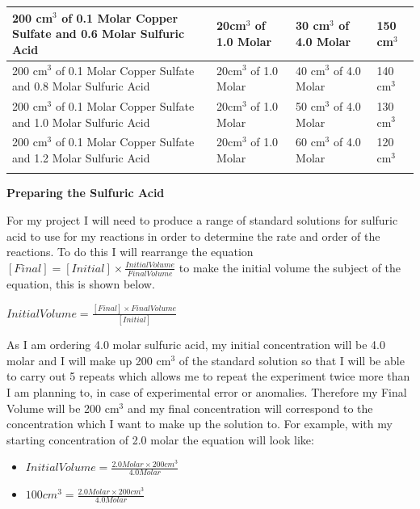 \begin{center}
\begin{tabular}{|p{5cm}|p{2cm}|p{2cm}|p{2cm}|}
200 cm$^3$ of 0.1 Molar Copper Sulfate and 0.6 Molar Sulfuric Acid &  20cm$^3$  of 1.0 Molar & 30 cm$^3$ of 4.0 Molar & 150 cm$^3$ \\ \hline

200 cm$^3$ of 0.1 Molar Copper Sulfate and 0.8 Molar Sulfuric Acid &  20cm$^3$  of 1.0 Molar & 40 cm$^3$ of 4.0 Molar & 140 cm$^3$ \\ \hline

200 cm$^3$ of 0.1 Molar Copper Sulfate and 1.0 Molar Sulfuric Acid &  20cm$^3$  of 1.0 Molar & 50 cm$^3$ of 4.0 Molar & 130 cm$^3$ \\ \hline

200 cm$^3$ of 0.1 Molar Copper Sulfate and 1.2 Molar Sulfuric Acid &  20cm$^3$  of 1.0 Molar & 60 cm$^3$ of 4.0 Molar & 120 cm$^3$ \\ \hline

\label{tab:Copper Sulfate Prepared Solutions}
\end{tabular}
\end{center}













\textbf{Preparing the Sulfuric Acid}

For my project I will need to produce a range of standard solutions for sulfuric acid to use for my reactions in order to determine the rate and order of the reactions. To do this I will rearrange the equation $[Final] = [Initial] \times \frac{Initial Volume}{Final Volume}$ to make the initial volume the subject of the equation, this is shown below.

$Initial Volume = \frac{[Final] \times Final Volume}{[Initial]}$

As I am ordering 4.0 molar sulfuric acid, my initial concentration will be 4.0 molar and I will make up 200 cm$^3$ of the standard solution so that I will be able to carry out 5 repeats which allows me to repeat the experiment twice more than I am planning to, in case of experimental error or anomalies. Therefore my Final Volume will be 200 cm$^3$ and my final concentration will correspond to the concentration which I want to make up the solution to. For example, with my starting concentration of 2.0 molar the equation will look like:

\begin{itemize}
\item $Initial Volume = \frac{2.0 Molar \times 200 cm^3}{4.0 Molar}$
\item $100 cm^3 = \frac{2.0 Molar \times 200 cm^3}{4.0 Molar}$
\end{itemize}

